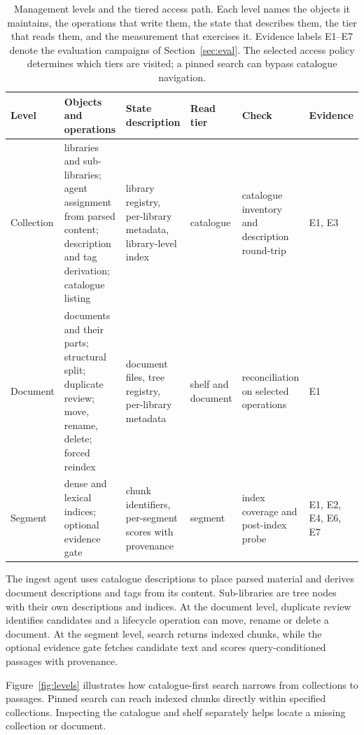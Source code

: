 \begin{table}[t]
\centering
\small
\setlength{\tabcolsep}{4pt}
\renewcommand{\arraystretch}{1.15}
\caption{ Management levels and the tiered access path. Each level names the
objects it maintains, the operations that write them, the state that describes
them, the tier that reads them, and the measurement that exercises it.
Evidence labels E1--E7 denote the evaluation campaigns of
Section~\ref{sec:eval}. The selected access policy determines which tiers are
visited; a pinned search can bypass catalogue navigation.}
\label{tab:levels}
\begin{tabular}{@{}>{\raggedright\arraybackslash}p{}>{\raggedright\arraybackslash}p{}>{\raggedright\arraybackslash}p{}>{\raggedright\arraybackslash}p{}>{\raggedright\arraybackslash}p{}>{\raggedright\arraybackslash}p{}@{}}
\toprule
Level & Objects and operations & State description & Read tier & Check & Evidence\\
\midrule
Collection & libraries and sub-libraries; agent assignment from parsed content; description and tag derivation; catalogue listing & library registry, per-library metadata, library-level index & catalogue & catalogue inventory and description round-trip & E1, E3\\
Document & documents and their parts; structural split; duplicate review; move, rename, delete; forced reindex & document files, tree registry, per-library metadata & shelf and document & reconciliation on selected operations & E1\\
Segment & dense and lexical indices; optional evidence gate & chunk identifiers, per-segment scores with provenance & segment & index coverage and post-index probe & E1, E2, E4, E6, E7\\
\bottomrule
\end{tabular}
\end{table}

The ingest agent uses catalogue descriptions to place parsed material and
derives document descriptions and tags from its content. Sub-libraries are
tree nodes with their own descriptions and indices. At the document level,
duplicate review identifies candidates and a lifecycle operation can move,
rename or delete a document. At the segment level, search returns indexed
chunks, while the optional evidence gate fetches candidate text and scores
query-conditioned passages with provenance.

 Figure~\ref{fig:levels} illustrates how catalogue-first search narrows
from collections to passages. Pinned search can reach indexed chunks
directly within specified collections. Inspecting the catalogue and shelf
separately helps locate a missing collection or document.


